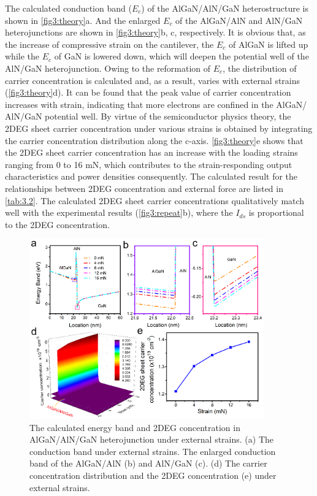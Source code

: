 The calculated conduction band  ($E_{c}$) of the AlGaN/AlN/GaN heterostructure is shown in \autoref{fig3:theory}a. And the enlarged $E_{c}$ of the AlGaN/AlN and AlN/GaN heterojunctions are shown in \autoref{fig3:theory}b, c, respectively. It is obvious that, as the increase of compressive strain on the  cantilever, the $E_{c}$ of AlGaN is lifted up while the $E_{c}$ of GaN is lowered down, which will deepen the potential well  of the AlN/GaN heterojunction. Owing to the reformation of $E_{c}$, the distribution of carrier concentration  is calculated and, as a result, varies with external strains (\autoref{fig3:theory}d). It can be found that the peak value of carrier concentration  increases with strain, indicating that more electrons are confined in the AlGaN/ AlN/GaN potential well. By virtue of the semiconductor physics theory, the 2DEG  sheet carrier concentration under various  strains is obtained by integrating the carrier concentration distribution along the c-axis. \autoref{fig3:theory}e shows that the 2DEG sheet carrier concentration has an increase with the loading strains ranging from 0 to 16 \unit{mN}, which contributes to the strain-responding output characteristics and power densities consequently. The calculated result for the relationships between 2DEG concentration and external force are listed in \autoref{tab:3.2}. The calculated 2DEG sheet carrier concentrations qualitatively match well with the experimental results (\autoref{fig3:repeat}b), where the $I_{ds}$ is proportional to the 2DEG  concentration.

\begin{figure}[H] 
\centering    
\includegraphics[width=0.9\textwidth]{ch3_theory}
\caption[The calculated energy band and 2DEG concentration in AlGaN/AlN/GaN heterojunction under external strains.]{The calculated energy band and 2DEG concentration in AlGaN/AlN/GaN heterojunction under external strains. (a) The conduction band under external strains. The enlarged conduction band of the AlGaN/AlN (b) and AlN/GaN (c). (d) The carrier concentration distribution and the 2DEG concentration (e) under external strains.}
\label{fig3:theory}
\end{figure}

